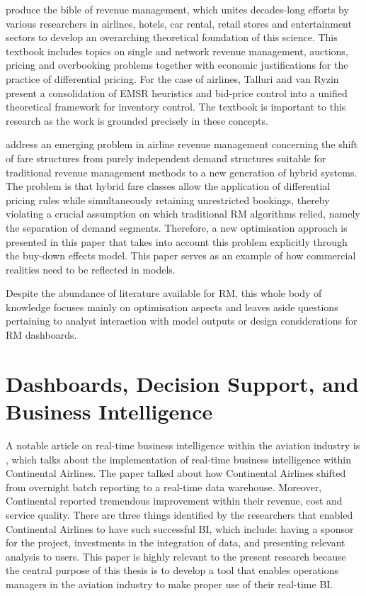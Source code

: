 \citet{TalluriVanRyzin2004} produce the bible of revenue management, which unites decades-long efforts by various researchers in airlines, hotels, car rental, retail stores and entertainment sectors to develop an overarching theoretical foundation of this science. This textbook includes topics on single and network revenue management, auctions, pricing and overbooking problems together with economic justifications for the practice of differential pricing. For the case of airlines, Talluri and van Ryzin present a consolidation of EMSR heuristics and bid-price control into a unified theoretical framework for inventory control. The textbook is important to this research as the work is grounded precisely in these concepts.

\citet{FiigIslerHopperstadBelobaba2010} address an emerging problem in airline revenue management concerning the shift of fare structures from purely independent demand structures suitable for traditional revenue management methods to a new generation of hybrid systems. The problem is that hybrid fare classes allow the application of differential pricing rules while simultaneously retaining unrestricted bookings, thereby violating a crucial assumption on which traditional RM algorithms relied, namely the separation of demand segments. Therefore, a new optimisation approach is presented in this paper that takes into account this problem explicitly through the buy-down effects model. This paper serves as an example of how commercial realities need to be reflected in models.

Despite the abundance of literature available for RM, this whole body of knowledge focuses mainly on optimisation aspects and leaves aside questions pertaining to analyst interaction with model outputs or design considerations for RM dashboards.

\section{Dashboards, Decision Support, and Business Intelligence}
\label{sec:ch2:bi}

A notable article on real-time business intelligence within the aviation industry is \citet{WatsonWixomHoffer2006}, which talks about the implementation of real-time business intelligence within Continental Airlines. The paper talked about how Continental Airlines shifted from overnight batch reporting to a real-time data warehouse. Moreover, Continental reported tremendous improvement within their revenue, cost and service quality. There are three things identified by the researchers that enabled Continental Airlines to have such successful BI, which include: having a sponsor for the project, investments in the integration of data, and presenting relevant analysis to users. This paper is highly relevant to the present research because the central purpose of this thesis is to develop a tool that enables operations managers in the aviation industry to make proper use of their real-time BI.

